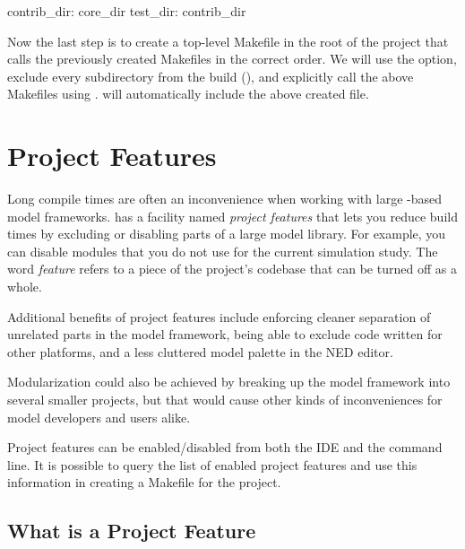 \begin{filelisting}
contrib_dir: core_dir
test_dir: contrib_dir
\end{filelisting}

Now the last step is to create a top-level Makefile in the root of the project that
calls the previously created Makefiles in the correct order. We will use the
 option, exclude every subdirectory from the build (),
and explicitly call the above Makefiles using .
 will automatically include the above created  file.


\section{Project Features}
\label{sec:build-sim-progs:project-features}

Long compile times are often an inconvenience when working with large
{\opp}-based model frameworks. {\opp} has a facility named \textit{project
features} that lets you reduce build times by excluding or disabling parts
of a large model library. For example, you can disable modules that you do
not use for the current simulation study. The word \textit{feature} refers
to a piece of the project's codebase that can be turned off as a whole.

Additional benefits of project features include enforcing cleaner
separation of unrelated parts in the model framework, being able to exclude
code written for other platforms, and a less cluttered model palette in the
NED editor.

\begin{note}
  Modularization could also be achieved by breaking up the model framework
  into several smaller projects, but that would cause other kinds of
  inconveniences for model developers and users alike.
\end{note}

Project features can be enabled/disabled from both the IDE and the command line.
It is possible to query the list of enabled project features and use this
information in creating a Makefile for the project.

\subsection{What is a Project Feature}
\label{sec:build-sim-progs:project-feature}

